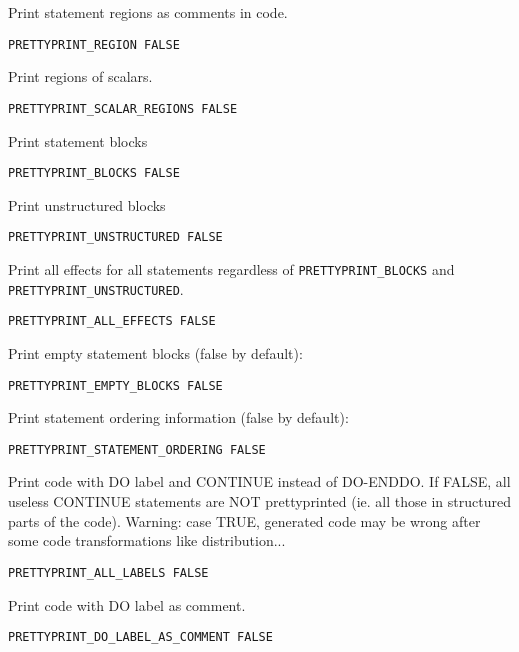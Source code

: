 Print statement regions as comments in code.

\begin{verbatim}
PRETTYPRINT_REGION FALSE
\end{verbatim}

Print regions of scalars.

\begin{verbatim}
PRETTYPRINT_SCALAR_REGIONS FALSE
\end{verbatim}

Print statement blocks

\begin{verbatim}
PRETTYPRINT_BLOCKS FALSE
\end{verbatim}

Print unstructured blocks

\begin{verbatim}
PRETTYPRINT_UNSTRUCTURED FALSE
\end{verbatim}

Print all effects for all statements regardless of \verb+PRETTYPRINT_BLOCKS+
and \verb+PRETTYPRINT_UNSTRUCTURED+.

\begin{verbatim}
PRETTYPRINT_ALL_EFFECTS FALSE
\end{verbatim}

Print empty statement blocks (false by default):

\begin{verbatim}
PRETTYPRINT_EMPTY_BLOCKS FALSE
\end{verbatim}

Print statement ordering information (false by default):

\begin{verbatim}
PRETTYPRINT_STATEMENT_ORDERING FALSE
\end{verbatim}

Print code with DO label and CONTINUE instead of DO-ENDDO. If FALSE, all
useless CONTINUE statements are NOT prettyprinted (ie. all those in
structured parts of the code). Warning: case TRUE, generated code may be
wrong after some code transformations like distribution...

\begin{verbatim}
PRETTYPRINT_ALL_LABELS FALSE
\end{verbatim}

Print code with DO label as comment.

\begin{verbatim}
PRETTYPRINT_DO_LABEL_AS_COMMENT FALSE
\end{verbatim}


